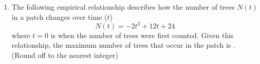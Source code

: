\documentclass[journal]{IEEEtran}
\begin{document}
\begin{enumerate}
   
 \item The following empirical relationship describes how the number of trees $N(t)$ in a patch changes over time ($t$)
    $$ N(t) = -2t^2 + 12t + 24 $$
    where $t = 0$ is when the number of trees were first counted.
Given this relationship, the maximum number of trees that occur in the patch is \underline{\hspace{3cm}}.
(Round off to the nearest integer)
\end{enumerate}
\bigskip
{}
\end{document}
